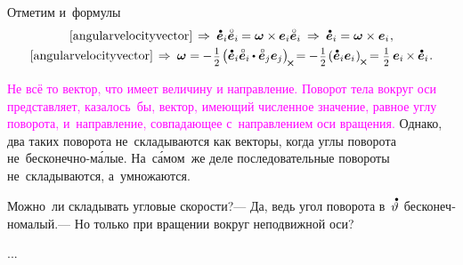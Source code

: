 \begin{otherlanguage}{russian}
\vspace{-0.25em}
Отметим и~формулы
\nopagebreak\vspace{.16em}\begin{equation}\label{angularvelocityandbasisvectors}
\begin{array}{c}
\eqref{angularvelocityvector} \hspace{.32ex} \Rightarrow\:
\mathdotabove{\bm{e}}_i \mathcircabove{\bm{e}}_i \hspace{-0.1ex} = \bm{\omega} \times \hspace{-0.1ex} \bm{e}_i \mathcircabove{\bm{e}}_i \:\Rightarrow\:
\mathdotabove{\bm{e}}_i = \bm{\omega} \times \bm{e}_i \hspace{.12ex},
\\[.32em]
%
\eqref{angularvelocityvector} \hspace{.32ex} \Rightarrow\:
\bm{\omega} = \hspace{-0.1ex} - \hspace{.16ex} \smalldisplaystyleonehalf \hspace{-.2ex} \left( \mathdotabove{\bm{e}}_i \mathcircabove{\bm{e}}_i \hspace{-0.1ex} \dotp \mathcircabove{\bm{e}}_j \bm{e}_j \right)_{\hspace{-0.25ex}\Xcompanion} \hspace{-0.32ex}
= \hspace{-0.1ex} - \hspace{.16ex} \smalldisplaystyleonehalf \hspace{-.2ex} \left( \mathdotabove{\bm{e}}_i \bm{e}_i \hspace{.1ex} \right)_{\hspace{-0.1ex}\Xcompanion} \hspace{-0.25ex}
= \smalldisplaystyleonehalf \hspace{.4ex} \bm{e}_i \hspace{-0.16ex} \times \hspace{-0.1ex} \mathdotabove{\bm{e}}_i
\hspace{.12ex} .
\end{array}
\end{equation}



\textcolor{magenta}{Не всё то вектор, что имеет величину и направление. Поворот тела вокруг оси представляет, казалось~бы, вектор, имеющий численное значение, равное углу поворота, и~направление, совпадающее с~направлением оси вращения.} Однако, два таких поворота не~складываются как векторы, когда углы поворота не~бесконечно-м\'{а}лые. На~с\'{а}мом~же деле последовательные повороты не~складываются, а~умножаются.

Можно~ли складывать угловые скорости?\:--- Да, ведь угол поворота в~$\mathdotabove{\vartheta}$ бесконечномалый.\:--- Но только при вращении вокруг неподвижной оси?

...



\end{otherlanguage}


